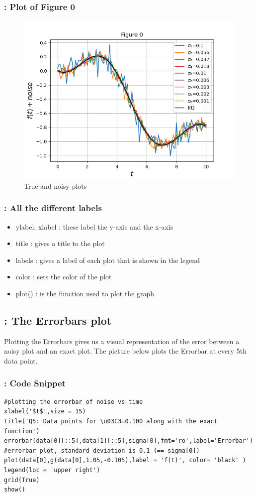 \documentclass[11pt]{article}
\begin{document}
\subsubsection{: Plot of Figure 0}
\begin{figure}[H]
    \centering
    \includegraphics[scale = 0.75]{Figure_1.png}
    \caption{True and noisy plots}
\end{figure}


\subsubsection{: All the different labels}
\begin{itemize}
    \item ylabel, xlabel : these label the y-axis and the x-axis
    \item title : gives a title to the plot
    \item labels : gives a label of each plot that is shown in the legend
    \item color : sets the color of the plot
    \item plot() : is the function used to plot the graph
\end{itemize}

\subsection{: The Errorbars plot}
Plotting the Errorbars gives us a visual representation of the error between a noisy plot and an exact plot. The picture below plots the Errorbar at every 5th data point. 
\subsubsection{: Code Snippet}
\begin{verbatim}
#plotting the errorbar of noise vs time
xlabel('$t$',size = 15)
title('Q5: Data points for \u03C3=0.100 along with the exact function')
errorbar(data[0][::5],data[1][::5],sigma[0],fmt='ro',label='Errorbar') 
#errorbar plot, standard deviation is 0.1 (== sigma[0])
plot(data[0],g(data[0],1.05,-0.105),label = 'f(t)', color= 'black' )
legend(loc = 'upper right')
grid(True)
show()
\end{verbatim}
\end{document}
